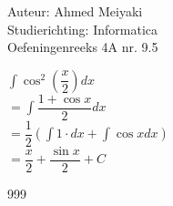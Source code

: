 \documentclass[a4paper]{article}
\begin{document}
  
\noindent \large Auteur: Ahmed Meiyaki \\
\noindent \large Studierichting: Informatica\\
\noindent \large Oefeningenreeks 4A nr. 9.5\\

\medskip

\normalsize

$\displaystyle\int \cos^2\left(\dfrac{x}{2}\right) dx $\\

$=\displaystyle\int \dfrac{1 + \cos x}{2} dx $\\

$=\dfrac{1}{2}\left(\displaystyle\int 1\cdot dx + \displaystyle\int \cos x dx\right) $\\

$= \dfrac{x}{2} +  \dfrac{\sin x}{2} + C $\\







\begin{thebibliography}{999}
\end{thebibliography}
\end{document}

